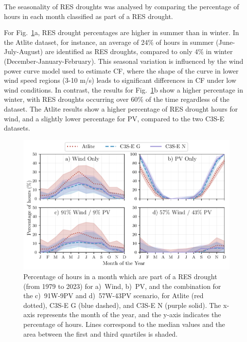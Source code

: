 \documentclass[a4paper, 11p1t]{article}
\begin{document}
The seasonality of RES droughts was analysed by comparing the percentage of hours in each month classified as part of a RES drought. 

For Fig.~\ref{fig:res_droughts_seasonality}a, RES drought percentages are higher in summer than in winter. In the Atlite dataset, for instance, an average of 24\% of hours in summer (June-July-August) are identified as RES droughts, compared to only 4\% in winter (December-January-February). This seasonal variation is influenced by the wind power curve model used to estimate CF, where the shape of the curve in lower wind speed regions (3-10 m/s) leads to significant differences in CF under low wind conditions. In contrast, the results for Fig.~\ref{fig:res_droughts_seasonality}b show a higher percentage in winter, with RES droughts occurring over 60\% of the time regardless of the dataset. The Atlite results show a higher percentage of RES drought hours for wind, and a slightly lower percentage for PV, compared to the two C3S-E datasets. 

\begin{figure}[!ht]
	\centering
	\includegraphics{droughts_seasonality.pdf}
	\caption{Percentage of hours in a month which are part of a RES drought (from 1979 to 2023) for a)~Wind, b)~PV, and the combination for the c)~91W-9PV and d)~57W-43PV scenario, for Atlite (red dotted), C3S-E G (blue dashed), and C3S-E N (purple solid). The x-axis represents the month of the year, and the y-axis indicates the percentage of hours. Lines correspond to the median values and the area between the first and third quartiles is shaded.}
	\label{fig:res_droughts_seasonality}
\end{figure}
\end{document}

